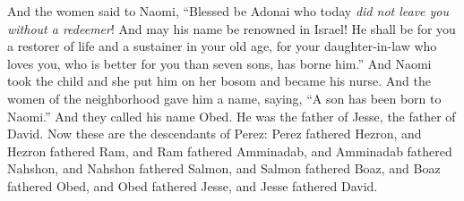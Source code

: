 \begin{biblechapter}
\verse And the women said to Naomi, “Blessed be Adonai who today \textit{did not leave you without a redeemer}! And may his name be renowned in Israel!
\verse He shall be for you a restorer of life and a sustainer in your old age, for your daughter-in-law who loves you, who is better for you than seven sons, has borne him.”
\verse And Naomi took the child and she put him on her bosom and became his nurse.
\verse And the women of the neighborhood gave him a name, saying, “A son has been born to Naomi.” And they called his name Obed. He was the father of Jesse, the father of David.
\verse Now these are the descendants of Perez: Perez fathered Hezron,
\verse and Hezron fathered Ram, and Ram fathered Amminadab,
\verse and Amminadab fathered Nahshon, and Nahshon fathered Salmon,
\verse and Salmon fathered Boaz, and Boaz fathered Obed,
\verse and Obed fathered Jesse, and Jesse fathered David.
\end{biblechapter}

